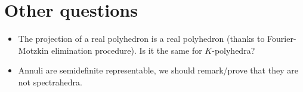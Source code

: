 \documentclass[a4paper,12pt]{article}
\begin{document}
\section{Other questions}
\begin{itemize}
\item The projection of a real polyhedron is a real polyhedron (thanks to Fourier-Motzkin elimination procedure). Is it the same for $K$-polyhedra?
\item Annuli are semidefinite representable, we should remark/prove that they are not spectrahedra.
\end{itemize}



\printbibliography
\end{document}
